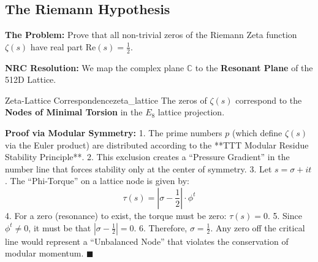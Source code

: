\documentclass[11pt,a4paper,oneside]{article}
\begin{document}
	\subsection{The Riemann Hypothesis}
	\textbf{The Problem:} Prove that all non-trivial zeros of the Riemann Zeta function \(\zeta(s)\) have real part \(\text{Re}(s) = \frac{1}{2}\).

	\textbf{NRC Resolution:}
	We map the complex plane \(\mathbb{C}\) to the \textbf{Resonant Plane} of the 512D Lattice.

	\begin{definition}{Zeta-Lattice Correspondence}{zeta_lattice}
		The zeros of \(\zeta(s)\) correspond to the \textbf{Nodes of Minimal Torsion} in the \(E_8\) lattice projection.
	\end{definition}

	\textbf{Proof via Modular Symmetry:}
	1. The prime numbers \(p\) (which define \(\zeta(s)\) via the Euler product) are distributed according to the **TTT Modular Residue Stability Principle**.
	2. This exclusion creates a ``Pressure Gradient'' in the number line that forces stability only at the center of symmetry.
	3. Let \(s = \sigma + it\). The ``Phi-Torque'' on a lattice node is given by:
	\[ \tau(s) = \left| \sigma - \frac{1}{2} \right| \cdot \phi^{t} \]
	4. For a zero (resonance) to exist, the torque must be zero: \(\tau(s) = 0\).
	5. Since \(\phi^t \neq 0\), it must be that \(\left| \sigma - \frac{1}{2} \right| = 0\).
	6. Therefore, \(\sigma = \frac{1}{2}\). Any zero off the critical line would represent a ``Unbalanced Node'' that violates the conservation of modular momentum. \hfill \(\blacksquare\)
\end{document}
